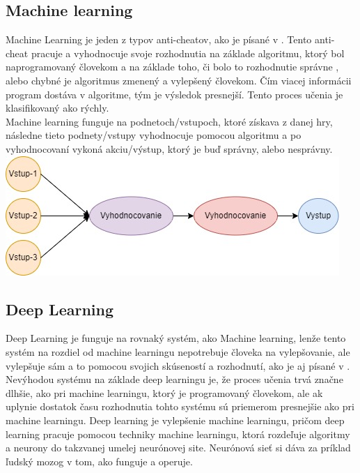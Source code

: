 \documentclass[twoside,twocolumn]{article}
\begin{document}
\subsection{Machine learning}
Machine Learning je jeden z typov anti-cheatov, ako je písané v \cite{willman2020machine}. Tento anti-cheat pracuje a vyhodnocuje svoje rozhodnutia na základe algoritmu, ktorý bol naprogramovaný človekom a na základe toho, či bolo to rozhodnutie správne , alebo chybné je algoritmus zmenený a vylepšený človekom. Čím viacej informácii program dostáva v algoritme, tým je výsledok presnejší. Tento proces učenia je klasifikovaný ako rýchly. \\
Machine learning funguje na podnetoch/vstupoch, ktoré získava z danej hry, následne tieto podnety/vstupy vyhodnocuje pomocou algoritmu a po vyhodnocovaní vykoná akciu/výstup, ktorý je buď správny, alebo nesprávny.\\

\textnormal{\includegraphics[scale=0.42]{Machine learning proces diagram.jpg}}
\label{machine learning proces}


\subsection{Deep Learning}
Deep Learning je funguje na rovnaký systém, ako Machine learning, lenže tento systém na rozdiel od machine learningu nepotrebuje človeka na vylepšovanie, ale vylepšuje sám a to pomocou svojich skúseností a rozhodnutí, ako je aj písané v \cite{zhang2021improvement}. Nevýhodou systému na základe deep learningu je, že proces učenia trvá značne dlhšie, ako pri machine learningu, ktorý je programovaný človekom, ale ak uplynie dostatok času rozhodnutia tohto systému sú priemerom presnejšie ako pri machine learningu.
Deep learning je vylepšenie machine learningu, pričom deep learning pracuje pomocou techniky machine learningu, ktorá rozdeľuje algoritmy a neurony do takzvanej umelej neurónovej site. Neurónová sieť si dáva za príklad ľudský mozog v tom, ako funguje a operuje.  


\end{document}

